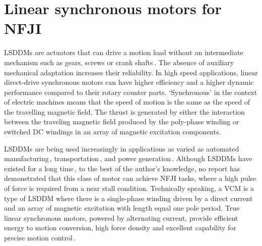 \section{Linear synchronous motors for NFJI}        \label{Chapter:background/linear synchronous motors for NFJI}

    
    \acp{LSDDM} are actuators that can drive a motion load without an intermediate mechanism such as gears, screws or crank shafts\,\cite{JacekF.GierasZbigniewJ.Piech2017}. The absence of auxiliary mechanical adaptation increases their reliability. In high speed applications, linear direct-drive synchronous motors can have higher efficiency and a higher dynamic performance compared to their rotary counter parts. ‘Synchronous’ in the context of electric machines means that the speed of motion is the same as the speed of the travelling magnetic field. The thrust is generated by either the interaction between the traveling magnetic field produced by the poly-phase winding or switched DC windings in an array of magnetic excitation components. 
    
    \acsp{LSDDM} are being used increasingly in applications as varied as automated manufacturing\,\cite{Meessen2010}, transportation\,\cite{Gysen2011,Cao2012,WenxiangZhao2012}, and power generation\,\cite{Li2011,Baker2019}. Although \acsp{LSDDM} have existed for a long time\,\cite{Boldea1997}, to the best of the author’s knowledge, no report has demonstrated that this class of motor can achieve \acs{NFJI} tasks, where a high pulse of force is required from a near stall condition. Technically speaking, a \acs{VCM} is a type of \acs{LSDDM} where there is a single-phase winding driven by a direct current and an array of magnetic excitation with length equal one pole period. True linear synchronous motors, powered by alternating current, provide efficient energy to motion conversion, high force density and excellent capability for precise motion control\,\cite{Trumper1994,Levi1973,Budig2000}.
    
    
